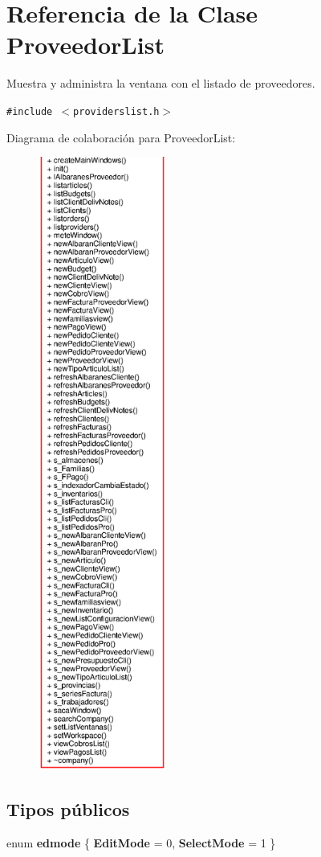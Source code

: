 \section{Referencia de la Clase Proveedor\-List}
\label{classProveedorList}
Muestra y administra la ventana con el listado de proveedores.  


{\tt \#include $<$providerslist.h$>$}

Diagrama de colaboraci\'{o}n para Proveedor\-List:\begin{figure}[H]
\begin{center}
\leavevmode
\includegraphics[width=119pt]{classProveedorList__coll__graph}
\end{center}
\end{figure}
\subsection*{Tipos p\'{u}blicos}
\begin{CompactItemize}
\item 
enum {\bf edmode} \{ {\bf Edit\-Mode} =  0, 
{\bf Select\-Mode} =  1
 \}
\end{CompactItemize}
